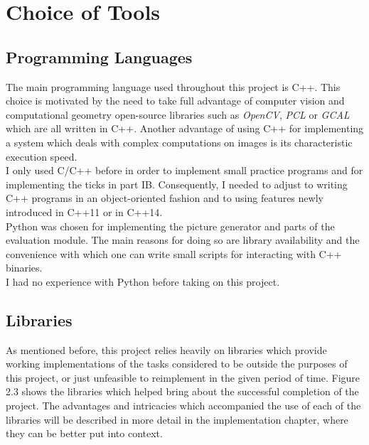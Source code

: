 \documentclass[12pt,a4paper,twoside,openright]{report}
\begin{document}
\section{Choice of Tools}

\subsection{Programming Languages}
The main programming language used throughout this project is C++. This choice is motivated by the need to take full advantage of computer vision and computational geometry open-source libraries such as \emph{OpenCV}, \emph{PCL} or \emph{GCAL} which are all written in C++. Another advantage of using C++ for implementing a system which deals with complex computations on images is its characteristic execution speed.\\
I only used C/C++ before in order to implement small practice programs and for implementing the ticks in part IB. Consequently, I needed to adjust to writing C++ programs in an object-oriented fashion and to using features newly introduced in C++11 or in C++14.\\
\linebreak
Python was chosen for implementing the picture generator and parts of the evaluation module. The main reasons for doing so are library availability and the convenience with which one can write small scripts for interacting with C++ binaries.\\
I had no experience with Python before taking on this project.   

\subsection{Libraries}
As mentioned before, this project relies heavily on libraries which provide working implementations of the tasks considered to be outside the purposes of this project, or just unfeasible to reimplement in the given period of time. Figure 2.3 shows the libraries which helped 
bring about the successful completion of the project. The advantages and intricacies which accompanied the use of each of the libraries will be described in more detail in the implementation chapter, where they can be better put into context.
\end{document}
